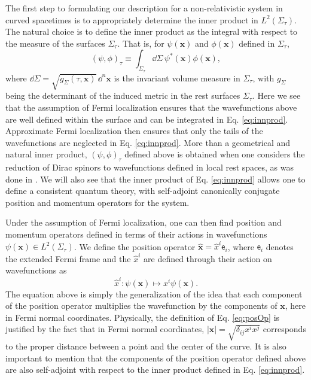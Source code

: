 \documentclass[letterpaper,12pt,titlepage,oneside,final]{book}
\newcommand{\mf}{\mathsf}%
\begin{document}
The first step to formulating our description for a non-relativistic system in curved spacetimes is to appropriately determine the inner product in $L^2(\Sigma_\tau)$. The natural choice is to define the inner product as the integral with respect to the measure of the surfaces $\Sigma_\tau$. That is, for $\psi(\bm x)$ and $\phi(\bm x)$ defined in $\Sigma_\tau$,
\begin{equation}\label{eq:innprod}
    (\psi,\phi)_\tau \equiv \int_{\Sigma_\tau} \dd \Sigma \, \psi^*(\bm x) \phi(\bm x),
\end{equation}
where $\dd \Sigma = \sqrt{g_\Sigma(\tau,\bm x)}\,\dd^n \bm x$ is the invariant volume measure in $\Sigma_\tau$, with $g_\Sigma$ being the determinant of the induced metric in the rest surfaces $\Sigma_\tau$. Here we see that the assumption of Fermi localization ensures that the wavefunctions above are well defined within the surface and can be integrated in Eq. \eqref{eq:innprod}. Approximate Fermi localization then ensures that only the tails of the wavefunctions are neglected in Eq. \eqref{eq:innprod}. More than a geometrical and natural inner product, $(\psi,\phi)_\tau$ defined above is obtained when one considers the reduction of Dirac spinors to wavefunctions defined in local rest spaces, as was done in \cite{jonas}. We will also see that the inner product of Eq. \eqref{eq:innprod} allows one to define a consistent quantum theory, with self-adjoint canonically conjugate position and momentum operators for the system.

Under the assumption of Fermi localization, one can then find position and momentum operators defined in terms of their actions in wavefunctions $\psi(\bm x)\in L^2(\Sigma_\tau)$. We define the position operator $\hat{\bm x} = \hat{x}^i \mathsf{e}_i$, where $\mf{e}_i$ denotes the extended Fermi frame and the $\hat{x}^i$ are defined through their action on wavefunctions as
\begin{equation}\label{eq:posOp}
    \hat{x}^i:\psi(\bm x)\longmapsto x^i \psi(\bm x).
\end{equation}
The equation above is simply the generalization of the idea that each component of the position operator multiplies the wavefunction by the components of $\bm x$, here in Fermi normal coordinates. Physically, the definition of Eq. \eqref{eq:posOp} is justified by the fact that in Fermi normal coordinates, $|\bm x|=\sqrt{\delta_{ij}x^ix^j}$ corresponds to the proper distance between a point and the center of the curve. It is also important to mention that the components of the position operator defined above are also self-adjoint with respect to the inner product defined in Eq. \eqref{eq:innprod}.
\end{document}
